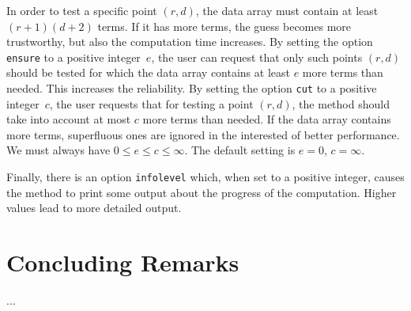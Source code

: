 \documentclass{amsart}
\begin{document}
In order to test a specific point $(r,d)$, the data array must contain at least $(r+1)(d+2)$ terms. 
If it has more terms, the guess becomes more trustworthy, but also the computation time increases.
By setting the option \verb|ensure| to a positive integer~$e$, the user can request that only 
such points $(r,d)$ should be tested for which the data array contains at least $e$ more terms than
needed. This increases the reliability. By setting the option \verb|cut| to a positive integer~$c$,
the user requests that for testing a point $(r,d)$, the method should take into account at most $c$
more terms than needed. If the data array contains more terms, superfluous ones are ignored in the
interested of better performance. We must always have $0\leq e\leq c\leq \infty$. The default setting
is $e=0$, $c=\infty$. 

Finally, there is an option \verb|infolevel| which, when set to a positive integer, causes the method
to print some output about the progress of the computation. Higher values lead to more detailed output.

\section{Concluding Remarks}

...

 
 
 
\end{document}
